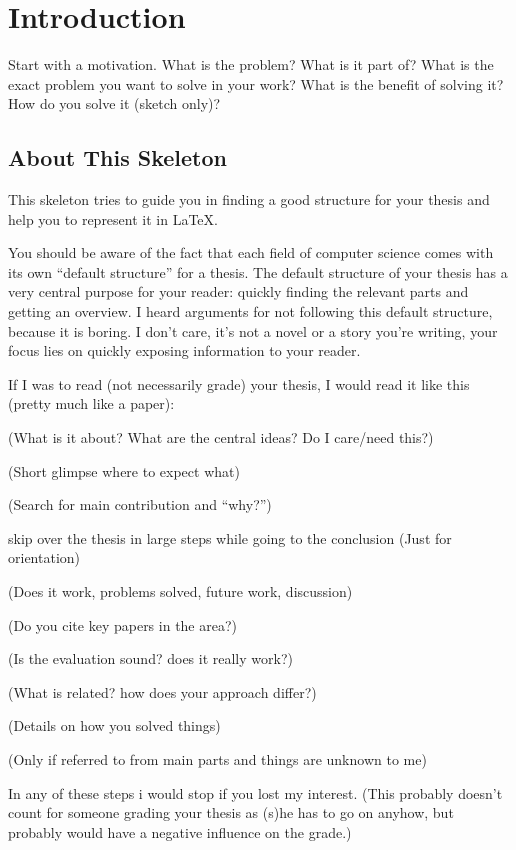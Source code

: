 
\chapter{Introduction}
	Start with a motivation.
	What is the problem?
	What is it part of?
	What is the exact problem you want to solve in your work?
	What is the benefit of solving it?
	How do you solve it (sketch only)?

	
	\section{About This Skeleton}
		This skeleton tries to guide you in finding a good structure for your thesis and help you to represent it in \LaTeX.
		
		You should be aware of the fact that each field of computer science comes with its own ``default structure'' for a thesis.
		The default structure of your thesis has a very central purpose for your reader: quickly finding the relevant parts and getting an overview.
		I heard arguments for not following this default structure, because it is boring.
		I don't care, it's not a novel or a story you're writing, your focus lies on quickly exposing information to your reader.
		
		If I was to read (not necessarily grade) your thesis, I would read it like this (pretty much like a paper):
		\begin{description}
			\item[Abstract] (What is it about? What are the central ideas? Do I care/need this?)
			\item[Table of contents] (Short glimpse where to expect what)
			\item[Intro] (Search for main contribution and ``why?'')
			\item skip over the thesis in large steps while going to the conclusion (Just for orientation)
			\item[Conclusion] (Does it work, problems solved, future work, discussion)
			\item[References] (Do you cite key papers in the area?)
			\item[Evaluation] (Is the evaluation sound? does it really work?)
			\item[Related work] (What is related? how does your approach differ?)
			\item[Main parts] (Details on how you solved things)
			\item[Foundations] (Only if referred to from main parts and things are unknown to me)
		\end{description}
		In any of these steps i would stop if you lost my interest.
		(This probably doesn't count for someone grading your thesis as (s)he has to go on anyhow, but probably would have a negative influence on the grade.)
		
